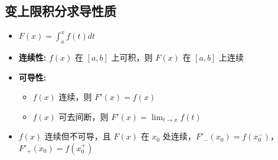 \documentclass[10pt]{article}
\begin{document}
\begin{multicols*}{2}
\section*{变上限积分求导性质}
\vspace{-8pt}

\begin{itemize}
  \item \(F(x) = \int_a^x f(t)dt\)
  \item \textbf{连续性:} \(f(x)\) 在 \([a,b]\) 上可积，则 \(F(x)\) 在 \([a,b]\) 上连续
  \item \textbf{可导性:}
    \begin{itemize}
      \item \(f(x)\) 连续，则 \(F'(x) = f(x)\)
      \item \(f(x)\) 可去间断，则 \(F'(x) = \lim_{t \to x} f(t)\)
    \end{itemize}
  \item \(f(x)\) 连续但不可导，且 \(F(x)\) 在 \(x_0\) 处连续，\(F'_-(x_0) = f(x_0^-)\)，\(F'_+(x_0) = f(x_0^+)\)
\end{itemize}


\end{multicols*}
\end{document}
